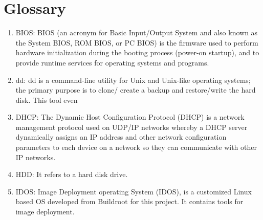 \documentclass[a4paper,12pt]{article}
\begin{document}
\newpage
\chapter{\fontsize{16pt}{1em} Glossary}
\begin{enumerate}
       \item BIOS: BIOS (an acronym for Basic Input/Output System and also known as the System BIOS, ROM BIOS, or PC BIOS) is the firmware used to perform hardware initialization during the booting process (power-on startup), and to provide runtime services for operating systems and programs.
    \item dd: dd is a command-line utility for Unix and Unix-like operating systems; the primary purpose is to clone/ create a backup and restore/write the hard disk. This tool even
    \item DHCP: The Dynamic Host Configuration Protocol (DHCP) is a network management protocol used on UDP/IP networks whereby a DHCP server dynamically assigns an IP address and other network configuration parameters to each device on a network so they can communicate with other IP networks.
    \item HDD: It refers to a hard disk drive.
    \item IDOS: Image Deployment operating System (IDOS), is a customized Linux based OS developed from Buildroot for this project. It contains tools for image deployment.
  

\end{enumerate}
\end{document}
